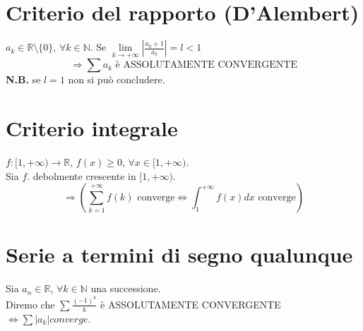 \documentclass{article}
\newcommand{\R}{\mathbb{R}}
\newcommand{\N}{\mathbb{N}}
\begin{document}
\begin{flushleft}
\section{Criterio del rapporto (D'Alembert)}
$a_k \in \R \setminus \{0\}$, $\forall k \in \N$. Se $\lim\limits_{k \to + \infty} \left|\frac{a_k+1}{a_k}\right| = l < 1$
\[
\Rightarrow \sum a_k \text{ è ASSOLUTAMENTE CONVERGENTE}
\]
\textbf{N.B.} se $l=1$ non si può concludere.

\section{Criterio integrale}
$f:[1, +\infty) \rightarrow \R$, $f(x) \geq 0$, $\forall x \in [1, +\infty)$.\\
Sia $f$. debolmente crescente in $[1, + \infty)$.
\[
\Rightarrow (\sum_{k = 1}^{+ \infty}f(k) \text{ converge} \iff \int_{1}^{+ \infty}f(x)dx \text{ converge})
\]

\section{Serie a termini di segno qualunque}
Sia $a_n \in \R$, $\forall k \in \N$ una successione.\\
Diremo che $\sum \frac{(-1)^k}{k}$ è ASSOLUTAMENTE CONVERGENTE $\iff \sum \left|a_k\right| converge$.
\end{flushleft}
\end{document}

